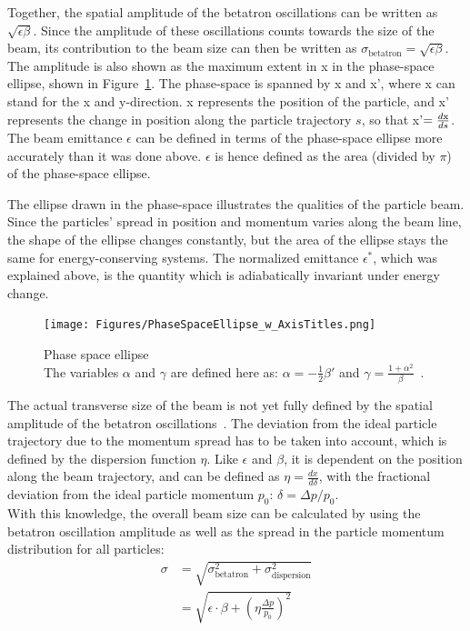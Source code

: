 Together, the spatial amplitude of the betatron oscillations can be written as $\sqrt{\epsilon\beta}$.
Since the amplitude of these oscillations counts towards the size of the beam, its contribution to the beam size can then be written as $\sigma_{\mathrm{betatron}} = \sqrt{\epsilon\beta}$.
The amplitude is also shown as the maximum extent in x in the phase-space ellipse, shown in Figure~\ref{fig:PhaseSpaceEllipse}.
The phase-space is spanned by x and x', where x can stand for the x and y-direction. 
x represents the position of the particle, and x' represents the change in position along the particle trajectory $s$, so that x'$=\frac{d\rm{x}}{ds}$.
The beam emittance $\epsilon$ can be defined in terms of the phase-space ellipse more accurately than it was done above.
$\epsilon$ is hence defined as the area (divided by $\pi$) of the phase-space ellipse.

The ellipse drawn in the phase-space illustrates the qualities of the particle beam.
Since the particles' spread in position and momentum varies along the beam line, the shape of the ellipse changes constantly, but the area of the ellipse stays the same for energy-conserving systems.
The normalized emittance $\epsilon^*$, which was explained above, is the quantity which is adiabatically invariant under energy change.
\begin{figure}[h]
\centering
\texttt{[image: Figures/PhaseSpaceEllipse\_w\_AxisTitles.png]}
\caption[Schematic of a phase space ellipse]{Phase space ellipse~\cite[based on p. 158]{Wiedemann}
\\The variables $\alpha$ and $\gamma$ are defined here as: $\alpha = -\frac12\beta'$ and $\gamma = \frac{1+\alpha^2}{\beta}$~\cite[cf. p. 283ff]{Wangler}.}
\label{fig:PhaseSpaceEllipse}
\end{figure}

The actual transverse size of the beam is not yet fully defined by the spatial amplitude of the betatron oscillations~\cite[cf. p. 108ff]{Conte}.
The deviation from the ideal particle trajectory due to the momentum spread has to be taken into account, which is defined by the dispersion function $\eta$.
Like $\epsilon$ and $\beta$, it is dependent on the position along the beam trajectory, and can be defined as $\eta = \frac{dx}{d\delta}$, with the fractional deviation from the ideal particle momentum $p_0$: $\delta = \Delta p/p_0$.
\\With this knowledge, the overall beam size can be calculated by using the betatron oscillation amplitude as well as the spread in the particle momentum distribution for all particles:
\begin{align}
 \sigma&=\sqrt{\sigma^2_{\mathrm{betatron}}+\sigma^2_{\mathrm{dispersion}}}\\
 &=\sqrt{\epsilon\cdot\beta+\left(\eta\frac{\Delta p}{p_0}\right)^2}
\end{align}

